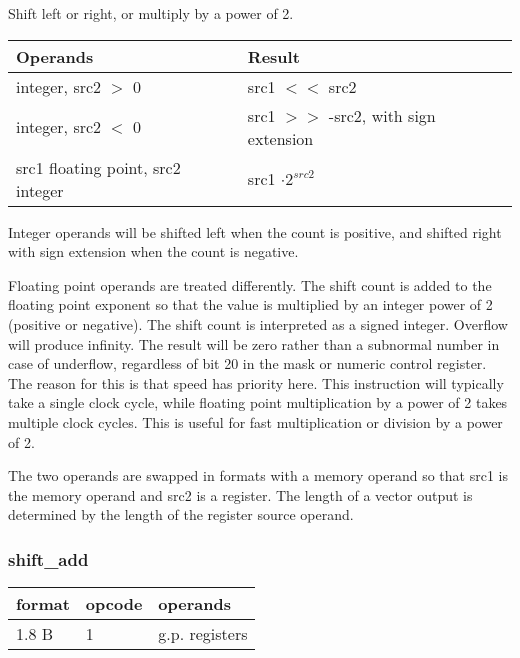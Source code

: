 \documentclass[forwardcom.tex]{subfiles}
\begin{document}
Shift left or right, or multiply by a power of 2.
\vspace{2mm}

\begin{longtable} {|p{60mm}|p{60mm}|}
\endfirsthead
\endhead
\hline
\bfseries Operands & \bfseries Result \\
\hline
integer, src2 $>$ 0  & src1 $<<$ src2 \\
integer, src2 $<$ 0  & src1 $>>$ -src2, with sign extension \\
src1 floating point, src2 integer & src1 $ \cdot 2^{src2} $ \\
\hline
\end{longtable}

Integer operands will be shifted left when the count is positive, and shifted right with
sign extension when the count is negative.
\vspace{2mm}

Floating point operands are treated differently. The shift count is added to the floating point exponent so that the value is multiplied by an integer power of 2 (positive or negative).
The shift count is interpreted as a signed integer. 
Overflow will produce infinity. The result will be zero rather than a subnormal number in case of underflow, regardless of bit 20 in the mask or numeric control register. 
The reason for this is that
speed has priority here. This instruction will typically take a single clock cycle, while floating point multiplication by a power of 2 takes multiple clock cycles. 
This is useful for fast multiplication or division by a power of 2.

\vspace{2mm}
The two operands are swapped in formats with a memory operand so that src1 is the memory operand and src2 is a register. The length of a vector output is determined by the length of the register source operand.

\subsubsection{shift\_add}
\label{table:shiftAddInstruction}
\begin{tabular}{|p{12mm}|p{12mm}|p{110mm}|}
\hline
\bfseries format & \bfseries opcode & \bfseries operands \\ \hline
1.8 B &  1 & g.p. registers \\ \hline
\end{tabular}
\vspace{2mm}
\end{document}
